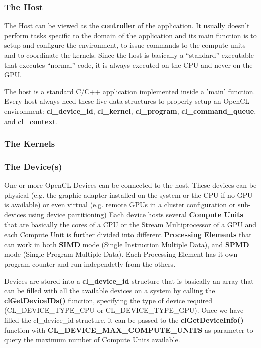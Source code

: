 \subsubsection*{The Host}
The Host can be viewed as the \textbf{controller} of the application. It usually doesn't perform tasks specific to the domain of the application and its main function is to setup and configure the environment, to issue commands to the compute units and to coordinate the kernels. Since the host is basically a ``standard'' executable that executes ``normal'' code, it is always executed on the CPU and never on the GPU.

\begin{CLCode}
The host is a standard C/C++ application implemented inside a 'main' function. Every host always need these five data structures to properly setup an OpenCL environment: \textbf{cl\_device\_id}, \textbf{cl\_kernel}, \textbf{cl\_program}, \textbf{cl\_command\_queue}, and \textbf{cl\_context}.
\end{CLCode}

\subsubsection*{The Kernels}

\subsubsection*{The Device(s)}
One or more OpenCL Devices can be connected to the host. These devices can be physical (e.g. the graphic adapter installed on the system or the CPU if no GPU is available) or even virtual (e.g. remote GPUs in a cluster configuration or sub-devices using device partitioning)
Each device hosts several \textbf{Compute Units} that are basically the cores of a CPU or the Stream Multiprocessor of a GPU and each Compute Unit is further divided into different \textbf{Processing Elements} that can work in both \textbf{SIMD} mode (Single Instruction Multiple Data), and \textbf{SPMD} mode (Single Program Multiple Data).
Each Processing Element has it own program counter and run independetly from the others.

\begin{CLCode}
Devices are stored into a \textbf{cl\_device\_id} structure that is basically an array that can be filled with  all the available devices on a system by calling the \textbf{clGetDeviceIDs()} function, specifying the type of device required (CL\_DEVICE\_TYPE\_CPU or CL\_DEVICE\_TYPE\_GPU). Once we have filled the cl\_device\_id structure, it can be passed to the \textbf{clGetDeviceInfo()} function  with \textbf{CL\_DEVICE\_MAX\_COMPUTE\_UNITS} as parameter to query the maximum number of Compute Units available.
\end{CLCode}

